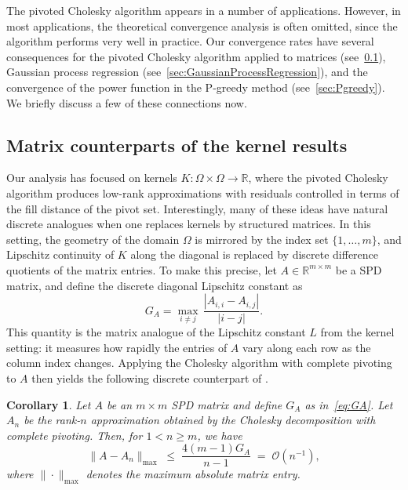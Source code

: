 \documentclass{amsart}
\newtheorem{corollary}{Corollary}[section]
\theoremstyle{definition}
\theoremstyle{remark}
\begin{document}
The pivoted Cholesky algorithm appears in a number of applications. However, in most applications, the theoretical convergence analysis is often omitted, since the algorithm performs very well in practice. Our convergence rates have several consequences for the pivoted Cholesky algorithm applied to matrices (see~\cref{sec:matrixcounterparts}), Gaussian process regression (see~\cref{sec:GaussianProcessRegression}), and the convergence of the power function in the P-greedy method (see~\cref{sec:Pgreedy}). We briefly discuss a few of these connections now. 

\subsection{Matrix counterparts of the kernel results}\label{sec:matrixcounterparts}

Our analysis has focused on kernels $K:\Omega\times\Omega\to\mathbb{R}$, where the pivoted Cholesky algorithm produces low-rank approximations with residuals controlled in terms of the fill distance of the pivot set. 
Interestingly, many of these ideas have natural discrete analogues when one replaces kernels by structured matrices. In this setting, the geometry of the domain $\Omega$ is mirrored by the index set $\{1,\dots,m\}$, and Lipschitz continuity of $K$ along the diagonal is replaced by discrete difference quotients of the matrix entries. To make this precise, let $A\in\mathbb{R}^{m\times m}$ be a SPD matrix, and define the discrete diagonal Lipschitz constant as
\begin{equation}
G_A = \max_{i\neq j}\,\frac{|A_{i,i}-A_{i,j}|}{|i-j|}.
\label{eq:GA}
\end{equation}
This quantity is the matrix analogue of the Lipschitz constant $L$ from the kernel setting: it measures how rapidly the entries of $A$ vary along each row as the column index changes. Applying the Cholesky algorithm with complete pivoting to $A$ then yields the following discrete counterpart of .

\begin{corollary}\label{cor:matrixversion}
    Let $A$ be an $m\times m$ SPD matrix and define $G_A$ as in~\cref{eq:GA}. Let $A_n$ be the rank-$n$ approximation obtained by the Cholesky decomposition with complete pivoting. 
    Then, for $1<n\geq m$, we have
    \[
        \|A - A_n\|_{\max} \;\leq\; \frac{4(m-1)G_A}{n-1} \;=\;\mathcal{O}(n^{-1}),
    \]
    where $\|\cdot\|_{\max}$ denotes the maximum absolute matrix entry.
\end{corollary}
\end{document}
